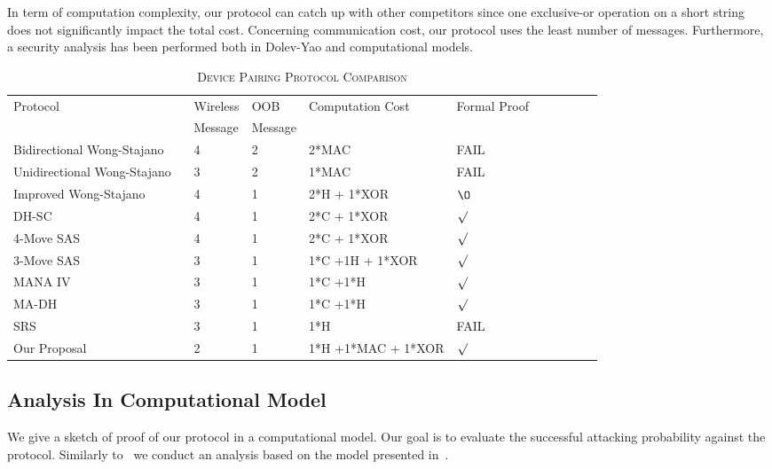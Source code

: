 In term of computation complexity, our protocol can catch up with other competitors since one exclusive-or operation on a short string does not significantly impact the total cost. Concerning communication cost, our protocol uses the least number of messages. Furthermore, a security 
analysis has been performed both in Dolev-Yao and computational models.

\begin{table}[ht] 
\centering
\caption{\textsc{Device Pairing Protocol Comparison}}
\label{devcom}
{\scriptsize
\begin{tabular}{ p{5cm} l l l l l p{1cm} l p{1cm} l }
\hline
Protocol & Wireless & OOB & Computation Cost & Formal Proof \\
  & Message & Message & & \\
\hline\hline
Bidirectional Wong-Stajano ~\cite{10.1109/MPRV.2007.76} & 4 & 2 & 2*MAC & FAIL \\ \hline
Unidirectional Wong-Stajano ~\cite{10.1109/MPRV.2007.76} & 3 & 2 & 1*MAC & FAIL \\ \hline
Improved Wong-Stajano ~\cite{Nguyen09authenticationprotocols} & 4 & 1 & 2*H + 1*XOR & $\O$ \\ \hline
DH-SC ~\cite{1580514} & 4 & 1 & 2*C + 1*XOR & $\surd$ \\ \hline
4-Move SAS ~\cite{Vaudenay:2005qa} & 4 & 1 & 2*C + 1*XOR & $\surd$ \\ \hline
3-Move SAS ~\cite{Vaudenay:2005qa} & 3 & 1 & 1*C +1H + 1*XOR & $\surd$ \\ \hline
MANA IV ~\cite{Laur:2006kl} & 3 & 1 & 1*C +1*H & $\surd$ \\ \hline
MA-DH ~\cite{Laur:2006kl} & 3 & 1 & 1*C +1*H & $\surd$ \\ \hline
SRS~\cite{5678019} &3 & 1 & 1*H &FAIL \\ \hline 
Our Proposal & 2 & 1 & 1*H +1*MAC + 1*XOR & $\surd$ \\ \hline
\end{tabular}
}
\end{table}

\subsection{Analysis In Computational Model}\label{proof-computational-model}

We give a sketch of proof of our protocol in a computational model. Our goal is to evaluate the successful attacking probability against the protocol. Similarly to~\cite{1580514} we conduct an analysis based on the model presented in~\cite{Bellare:1994aa}. 

